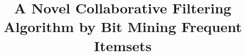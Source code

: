 \documentclass{sig-alternate}
\begin{document}


\doi{}

\isbn{}

\conferenceinfo{}{}

\acmPrice{\$}

%

\title{A Novel Collaborative Filtering Algorithm by Bit Mining Frequent Itemsets}
%
%
%
%
%
\end{document}
